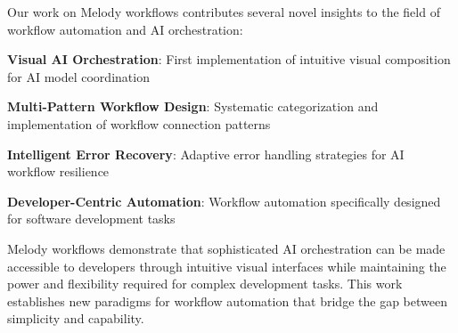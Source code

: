 Our work on Melody workflows contributes several novel insights to the field of workflow automation and AI orchestration:

\begin{expandedlist}
    \item \textbf{Visual AI Orchestration}: First implementation of intuitive visual composition for AI model coordination
    \item \textbf{Multi-Pattern Workflow Design}: Systematic categorization and implementation of workflow connection patterns
    \item \textbf{Intelligent Error Recovery}: Adaptive error handling strategies for AI workflow resilience
    \item \textbf{Developer-Centric Automation}: Workflow automation specifically designed for software development tasks
\end{expandedlist}

Melody workflows demonstrate that sophisticated AI orchestration can be made accessible to developers through intuitive visual interfaces while maintaining the power and flexibility required for complex development tasks. This work establishes new paradigms for workflow automation that bridge the gap between simplicity and capability.
